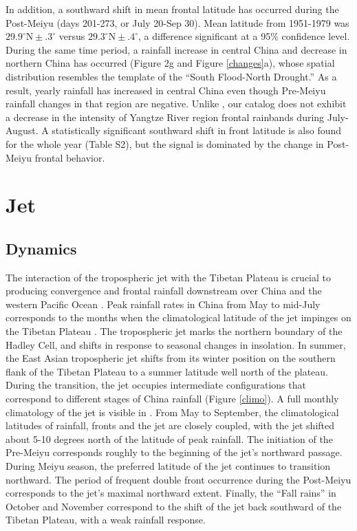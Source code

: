 \documentclass[draft,grl]{AGUTeX}
\begin{document}
\begin{article}
	In addition, a southward shift in mean frontal latitude has occurred during the Post-Meiyu (days 201-273, or July 20-Sep 30). Mean latitude from 1951-1979 was $29.9^\circ \textrm{N} \pm .3^\circ$ versus $29.3^\circ \textrm{N} \pm .4^\circ$, a difference significant at a 95\% confidence level. During the same time period, a rainfall increase in central China and decrease in northern China has occurred (Figure 2g and Figure \ref{changes}a), whose spatial distribution resembles the template of the ``South Flood-North Drought.'' As a result, yearly rainfall has increased in central China even though Pre-Meiyu rainfall changes in that region are negative. Unlike \citet{Yu2010},  our catalog does not exhibit a decrease in the intensity of Yangtze River region frontal rainbands during July-August. A statistically significant southward shift in front latitude is also found for the whole year (Table S2), but the signal is dominated by the change in Post-Meiyu frontal behavior.
	
\section{Jet}

\subsection{Dynamics}

	The interaction of the tropospheric jet with the Tibetan Plateau is crucial to producing convergence and frontal rainfall downstream over China and the western Pacific Ocean \citep{Molnar2010,Sampe2010,Chen2014}. Peak rainfall rates in China from May to mid-July corresponds to the months when the climatological latitude of the jet impinges on the Tibetan Plateau \citep{Schiemann2009}. The tropospheric jet marks the northern boundary of the Hadley Cell, and shifts in response to seasonal changes in insolation. In summer, the East Asian tropospheric jet shifts from its winter position on the southern flank of the Tibetan Plateau to a summer latitude well north of the plateau. During the transition, the jet occupies intermediate configurations that correspond to different stages of China rainfall (Figure \ref{climo}). A full monthly climatology of the jet is visible in \citet{Schiemann2009}. From May to September,  the climatological latitudes of rainfall, fronts and the jet are closely coupled, with the jet shifted about 5-10 degrees north of the latitude of peak rainfall. The initiation of the Pre-Meiyu corresponds roughly to the beginning of the jet's northward passage. During Meiyu season, the preferred latitude of the jet continues to transition northward. The period of frequent double front occurrence during the Post-Meiyu corresponds to the jet's maximal northward extent. Finally, the ``Fall rains'' in October and November correspond to the shift of the jet back southward of the Tibetan Plateau, with a weak rainfall response.
	

\end{article}
\end{document}
